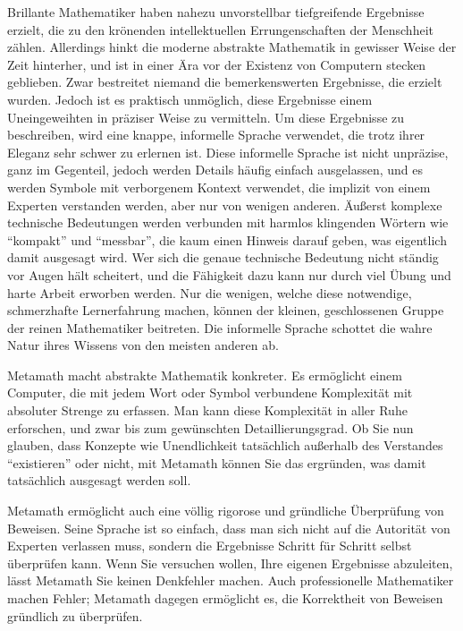 Brillante Mathematiker haben nahezu unvorstellbar tiefgreifende Ergebnisse erzielt, die zu den krönenden intellektuellen Errungenschaften der Menschheit zählen.  Allerdings hinkt die moderne abstrakte Mathematik in gewisser Weise der Zeit hinterher, und ist in einer Ära vor der Existenz von Computern stecken geblieben.
Zwar bestreitet niemand die bemerkenswerten Ergebnisse, die erzielt wurden.  Jedoch ist es praktisch unmöglich, diese Ergebnisse einem Uneingeweihten in präziser Weise zu vermitteln.  Um diese Ergebnisse zu beschreiben, wird eine knappe, informelle Sprache verwendet, die trotz ihrer Eleganz sehr schwer zu erlernen ist.  Diese informelle Sprache ist nicht unpräzise, ganz im Gegenteil, jedoch werden Details häufig einfach ausgelassen, und es werden Symbole mit verborgenem Kontext verwendet, die implizit von einem Experten verstanden werden, aber nur von wenigen anderen.
Äußerst komplexe technische Bedeutungen werden verbunden mit harmlos klingenden Wörtern wie "`kompakt"' und "`messbar"', die kaum einen Hinweis darauf geben, was eigentlich damit ausgesagt wird.  Wer sich die genaue technische Bedeutung nicht ständig vor Augen hält scheitert, und die Fähigkeit dazu kann nur durch viel Übung und harte Arbeit erworben werden.  Nur die wenigen, welche diese notwendige, schmerzhafte Lernerfahrung machen, können der kleinen, geschlossenen Gruppe der reinen Mathematiker beitreten.  Die informelle Sprache schottet die wahre Natur ihres Wissens von den meisten anderen ab.

Metamath macht abstrakte Mathematik konkreter.  Es ermöglicht einem Computer, die mit jedem Wort oder Symbol verbundene Komplexität mit absoluter Strenge zu erfassen.  Man kann diese Komplexität in aller Ruhe erforschen, und zwar bis zum gewünschten Detaillierungsgrad.  Ob Sie nun glauben, dass Konzepte wie Unendlichkeit tatsächlich außerhalb des Verstandes "`existieren"' oder nicht, mit Metamath können Sie das ergründen, was damit tatsächlich ausgesagt werden soll.

Metamath ermöglicht auch eine völlig rigorose und gründliche Überprüfung von Beweisen.
Seine Sprache ist so einfach, dass man sich nicht auf die Autorität von Experten verlassen muss, sondern die Ergebnisse Schritt für Schritt selbst überprüfen kann.  Wenn Sie versuchen wollen, Ihre eigenen Ergebnisse abzuleiten, lässt Metamath Sie keinen Denkfehler machen.
Auch professionelle Mathematiker machen Fehler; Metamath dagegen ermöglicht es, die Korrektheit von Beweisen gründlich zu überprüfen.

